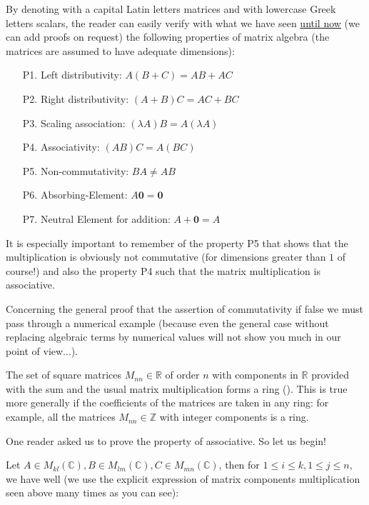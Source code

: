 	By denoting with a capital Latin letters matrices and with lowercase Greek letters scalars, the reader can easily verify with what we have seen \underline{until now} (we can add proofs on request) the following properties of matrix algebra (the matrices are assumed to have adequate dimensions)\label{non-commutativity matrices}:
	\begin{enumerate}
		\item[P1.] Left distributivity: $A(B+C)=AB+AC$
		\item[P2.] Right distributivity: $(A+B)C=AC+BC$
		\item[P3.] Scaling association: $(\lambda A)B=A(\lambda A)$
		\item[P4.] Associativity: $(AB)C=A(BC)$
		\item[P5.] Non-commutativity: $BA\neq AB$
		\item[P6.] Absorbing-Element: $A\mathbf{0}=\mathbf{0}$
		\item[P7.] Neutral Element for addition: $A+\mathbf{0}=A$
	\end{enumerate}
	It is especially important to remember of the property P5 that shows that the multiplication is obviously not commutative (for dimensions greater than $1$ of course!) and also the property P4 such that the matrix multiplication is associative.
	
	Concerning the general proof that the assertion of commutativity if false we must pass through a numerical example (because even the general case without replacing algebraic terms by numerical values will not show you much in our point of view...).
	
	\begin{tcolorbox}[title=Remark,colframe=black,arc=10pt]
	The set of square matrices $M_{nn}\in \mathbb{R}$ of order $n$ with components in $\mathbb{R}$ provided with the sum and the usual matrix multiplication forms a ring (). This is true more generally if the coefficients of the matrices are taken in any ring: for example, all the matrices $M_{nn}\in \mathbb{Z}$  with integer components is a ring.
	\end{tcolorbox}
	One reader asked us to prove the property of associative. So let us begin!
	
	Let $A\in M_{kl}(\mathbb{C}),B\in M_{lm}(\mathbb{C}),C\in M_{mn}(\mathbb{C})$, then for $1\leq i\leq k,1\leq j\leq n$, we have well (we use the explicit expression of matrix components multiplication seen above many times as you can see):
	
